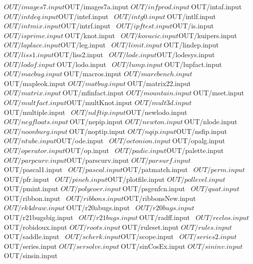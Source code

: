\documentclass{article}
\begin{document}
       ${OUT}/images7.input  ${OUT}/images7a.input   ${OUT}/infprod.input \
       ${OUT}/intaf.input    ${OUT}/intdeq.input     ${OUT}/intef.input \
       ${OUT}/intg0.input    \
       ${OUT}/intlf.input    ${OUT}/intmix.input     ${OUT}/intrf.input \
       ${OUT}/ipftest.input  ${OUT}/is.input         ${OUT}/isprime.input \
       ${OUT}/knot.input \
       ${OUT}/kovacic.input  ${OUT}/kuipers.input    \
       ${OUT}/laplace.input  ${OUT}/leg.input        \
       ${OUT}/limit.input \
       ${OUT}/lindep.input   ${OUT}/liss1.input      ${OUT}/liss2.input \
       ${OUT}/lode.input       ${OUT}/lodesys.input \
       ${OUT}/lodof.input \
       ${OUT}/lodo.input     \
       ${OUT}/lump.input \
       ${OUT}/lupfact.input  \
       ${OUT}/macbug.input \
       ${OUT}/macros.input   ${OUT}/marcbench.input  \
       ${OUT}/mapleok.input  ${OUT}/matbug.input \
       ${OUT}/matrix22.input ${OUT}/matrix.input     \
       ${OUT}/mfinfact.input ${OUT}/mountain.input \
       ${OUT}/mset.input       \
       ${OUT}/multfact.input ${OUT}/multKnot.input   ${OUT}/mult3d.input \
       ${OUT}/multiple.input \
       ${OUT}/ndftip.input   ${OUT}/newlodo.input \
       ${OUT}/negfloats.input \
       ${OUT}/nepip.input    ${OUT}/newton.input \
       ${OUT}/nlode.input    ${OUT}/noonburg.input \
       ${OUT}/noptip.input   ${OUT}/nqip.input       ${OUT}/nsfip.input \
       ${OUT}/ntube.input    ${OUT}/ode.input \
       ${OUT}/octonion.input \
       ${OUT}/opalg.input    ${OUT}/operator.input   ${OUT}/op.input \
       ${OUT}/padic.input    ${OUT}/palette.input \
       ${OUT}/parpcurv.input ${OUT}/parscurv.input   ${OUT}/parsurf.input \
       ${OUT}/pascal1.input \
       ${OUT}/pascal.input   ${OUT}/patmatch.input   \
       ${OUT}/perm.input     ${OUT}/pfr.input        \
       ${OUT}/pinch.input    ${OUT}/plotfile.input   ${OUT}/pollevel.input \
       ${OUT}/pmint.input    ${OUT}/polycoer.input \
       ${OUT}/psgenfcn.input   \
       ${OUT}/quat.input     ${OUT}/ribbon.input   \
       ${OUT}/ribbons.input  ${OUT}/ribbonsNew.input ${OUT}/rk4draw.input  \
       ${OUT}/r20abugs.input \
       ${OUT}/r20bugs.input  ${OUT}/r21bugsbig.input \
       ${OUT}/r21bugs.input \
       ${OUT}/radff.input    \
       ${OUT}/reclos.input   \
       ${OUT}/robidoux.input ${OUT}/roots.input \
       ${OUT}/ruleset.input  ${OUT}/rules.input      ${OUT}/saddle.input \
       ${OUT}/scherk.input   ${OUT}/scope.input \
       ${OUT}/series2.input \
       ${OUT}/series.input   ${OUT}/sersolve.input   \
       ${OUT}/sinCosEx.input ${OUT}/sininv.input     ${OUT}/sinsin.input \
\end{document}
